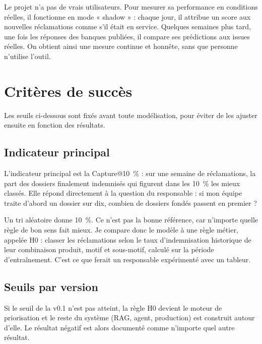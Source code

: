 \documentclass[11pt,a4paper]{article}
\begin{document}
Le projet n'a pas de vrais utilisateurs. Pour mesurer sa performance en conditions réelles, il fonctionne en mode « shadow » : chaque jour, il attribue un score aux nouvelles réclamations comme s'il était en service. Quelques semaines plus tard, une fois les réponses des banques publiées, il compare ses prédictions aux issues réelles. On obtient ainsi une mesure continue et honnête, sans que personne n'utilise l'outil.

\section{Critères de succès}
\label{sec:criteres}

Les seuils ci-dessous sont fixés avant toute modélisation, pour éviter de les ajuster ensuite en fonction des résultats.

\subsection{Indicateur principal}

L'indicateur principal est la Capture@10~\% : sur une semaine de réclamations, la part des dossiers finalement indemnisés qui figurent dans les 10~\% les mieux classés. Elle répond directement à la question du responsable : si mon équipe traite d'abord un dossier sur dix, combien de dossiers fondés passent en premier ?

Un tri aléatoire donne 10~\%. Ce n'est pas la bonne référence, car n'importe quelle règle de bon sens fait mieux. Je compare donc le modèle à une règle métier, appelée H0 : classer les réclamations selon le taux d'indemnisation historique de leur combinaison produit, motif et sous-motif, calculé sur la période d'entraînement. C'est ce que ferait un responsable expérimenté avec un tableur.

\subsection{Seuils par version}

Si le seuil de la v0.1 n'est pas atteint, la règle H0 devient le moteur de priorisation et le reste du système (RAG, agent, production) est construit autour d'elle. Le résultat négatif est alors documenté comme n'importe quel autre résultat.
\end{document}
